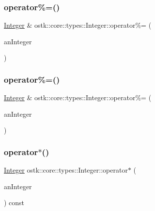 \subsubsection{\texorpdfstring{operator\%=()}{operator\%=()}\hspace{0.1cm}{\footnotesize\ttfamily [1/2]}}
{\footnotesize\ttfamily \hyperlink{classostk_1_1core_1_1types_1_1_integer}{Integer} \& ostk\+::core\+::types\+::\+Integer\+::operator\%= (\begin{DoxyParamCaption}\item[{const \hyperlink{classostk_1_1core_1_1types_1_1_integer}{Integer} \&}]{an\+Integer }\end{DoxyParamCaption})}

\mbox{\label{classostk_1_1core_1_1types_1_1_integer_a534adb3e7ce4395443cd06b64290092e}} 
\subsubsection{\texorpdfstring{operator\%=()}{operator\%=()}\hspace{0.1cm}{\footnotesize\ttfamily [2/2]}}
{\footnotesize\ttfamily \hyperlink{classostk_1_1core_1_1types_1_1_integer}{Integer} \& ostk\+::core\+::types\+::\+Integer\+::operator\%= (\begin{DoxyParamCaption}\item[{const \hyperlink{classostk_1_1core_1_1types_1_1_integer_a76a5f41f78659f116eafaf26cecc3244}{Integer\+::\+Value\+Type} \&}]{an\+Integer }\end{DoxyParamCaption})}

\mbox{\label{classostk_1_1core_1_1types_1_1_integer_a289a931e70f65bf6ffcca32f9122981b}} 
\subsubsection{\texorpdfstring{operator$\ast$()}{operator*()}\hspace{0.1cm}{\footnotesize\ttfamily [1/3]}}
{\footnotesize\ttfamily \hyperlink{classostk_1_1core_1_1types_1_1_integer}{Integer} ostk\+::core\+::types\+::\+Integer\+::operator$\ast$ (\begin{DoxyParamCaption}\item[{const \hyperlink{classostk_1_1core_1_1types_1_1_integer}{Integer} \&}]{an\+Integer }\end{DoxyParamCaption}) const}

